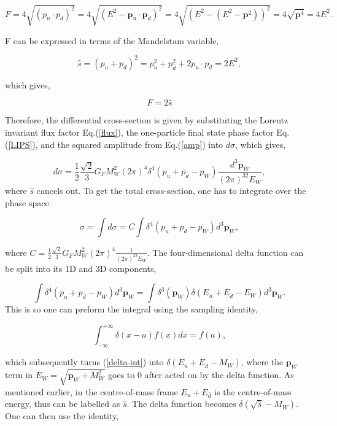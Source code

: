 \documentclass[a4paper,11pt]{article}
\begin{document}
$$ F = 4\sqrt{(p_u \cdot p_{\bar{d}})^2} = 4\sqrt{(E^2 - \boldsymbol{p}_u\cdot\boldsymbol{p}_{\bar{d}})^2} = 4\sqrt{(E^2 - (E^2 - \boldsymbol{p}^2))^2}  =4\sqrt{\boldsymbol{p}^4} =4E^2.$$

F can be expressed in terms of the Mandelstam variable, 

$$ \hat{s} = (p_u+ p_{\bar{d}})^2 = p_u^2 + p_{\bar{d}}^2 +2p_u\cdot p_{\bar{d}} = 2E^2, $$

which gives,

\begin{equation}\label{flux}
	F = 2\hat{s}
\end{equation}

Therefore, the differential cross-section is given by substituting the Lorentz invariant flux factor Eq.(\ref{flux}), the one-particle final state phase factor Eq.(\ref{LIPS}), and the squared amplitude from Eq.(\ref{amp}) into $d\sigma$, which gives,

\begin{equation}\label{dsigma}
		d\sigma  =\frac{1}{2} \frac{\sqrt{2}}{3}G_F M_W^2 (2\pi)^4 \delta^4(p_u +p_{\bar{d}} - p_W) \frac{d^3\boldsymbol{p}_W}{(2\pi)^32E_W},
\end{equation}
where $\hat{s}$ cancels out. To get the total cross-section, one has to integrate over the phase space.

$$\sigma = \int d\sigma = C \int \delta^4(p_u +p_{\bar{d}} - p_W) d^3\boldsymbol{p}_W, $$

where $C =\frac{1}{2}\frac{\sqrt{2}}{3}G_FM^2_W(2\pi)^4\frac{1}{(2\pi)^32E_W} $. The four-dimensional delta function can be split into its 1D and 3D components,

\begin{equation}\label{delta-int}
	\int \delta^4(p_u +p_{\bar{d}} - p_W) d^3\boldsymbol{p}_W = \int \delta^3(\boldsymbol{p}_W)\delta(E_u + E_{\bar{d}} - E_W) d^3\boldsymbol{p}_W.
\end{equation}
This is so one can preform the integral using the sampling identity,

$$\int_{-\infty}^{+\infty} \delta(x-a)f(x) dx = f(a),$$

which subsequently  turns (\ref{delta-int}) into $\delta(E_u + E_{\bar{d}} - M_W)$, where the $\boldsymbol{p}_W$ term in $E_W = \sqrt{\boldsymbol{p}_W+ M^2_W}$ goes to 0 after acted on by the delta function. As mentioned earlier, in the centre-of-mass frame $E_u + E_{\bar{d}}$ is the centre-of-mass energy, thus can be labelled as $\hat{s}$. The delta function becomes $\delta(\sqrt{\hat{s}} - M_W)$. One can then use the identity,
\end{document}
